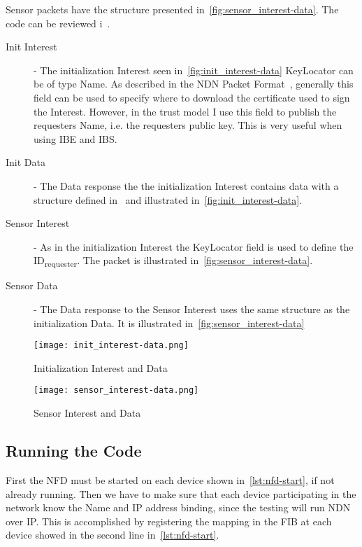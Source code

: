 Sensor packets have the structure presented in~\autoref{fig:sensor_interest-data}.
The code can be reviewed i~\cite[messageBuf.proto]{garseg15}.
\begin{description}
	\item[Init Interest] - 
  The initialization Interest seen in~\autoref{fig:init_interest-data}
  KeyLocator can be of type Name. 
  As described in the \gls{NDN} Packet Format~\cite{ndnpacketformat}, generally this field can be used to specify where to download the certificate used to sign the Interest.
  However, in the trust model I use this field to publish the requesters Name, i.e. the requesters public key. 
  This is very useful when using \gls{IBE} and \gls{IBS}.
	\item[Init Data] - 
  The Data response the the initialization Interest contains data with a structure defined in~\cite[messageBuf.proto]{garseg15} and illustrated in~\autoref{fig:init_interest-data}.
	\item[Sensor Interest] -
	As in the initialization Interest the KeyLocator field is used to define the ID\textsubscript{requester}. 
  The packet is illustrated in~\autoref{fig:sensor_interest-data}.
	\item[Sensor Data] - 
  The Data response to the Sensor Interest uses the same structure as the initialization Data. 
  It is illustrated in~\autoref{fig:sensor_interest-data}
\end{description}

\begin{figure}[ht]
  \centering
  \texttt{[image: init\_interest-data.png]}
  \caption{Initialization Interest and Data}
  \label{fig:init_interest-data}
\end{figure}

\begin{figure}[ht]
  \centering
  \texttt{[image: sensor\_interest-data.png]}
  \caption{Sensor Interest and Data}
  \label{fig:sensor_interest-data}
\end{figure}

\subsection{Running the Code}
First the \gls{NFD} must be started on each device shown in~\autoref{lst:nfd-start}, if not already running. 
Then we have to make sure that each device participating in the network know the Name and \gls{IP} address binding, since the testing will run \gls{NDN} over \gls{IP}.
This is accomplished by registering the mapping in the \gls{FIB} at each device showed in the second line in~\autoref{lst:nfd-start}.

